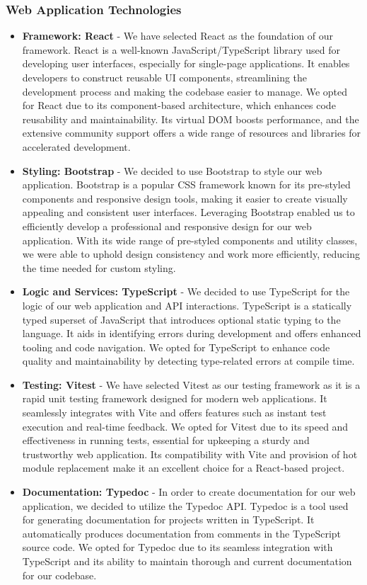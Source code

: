\documentclass[12pt]{article}
\begin{document}
\subsubsection{Web Application Technologies}
\begin{itemize}
	\item \textbf{Framework: React\cite{react}} - We have selected React as the foundation of our framework. React is a well-known JavaScript\cite{javascript}/TypeScript\cite{typescript} library used for developing user interfaces, especially for single-page applications. It enables developers to construct reusable UI components, streamlining the development process and making the codebase easier to manage.
	      We opted for React due to its component-based architecture, which enhances code reusability and maintainability. Its virtual DOM boosts performance, and the extensive community support offers a wide range of resources and libraries for accelerated development.
	\item \textbf{Styling: Bootstrap\cite{bootstrap}} - We decided to use Bootstrap to style our web application. Bootstrap is a popular CSS\cite{css} framework known for its pre-styled components and responsive design tools, making it easier to create visually appealing and consistent user interfaces. Leveraging Bootstrap enabled us to efficiently develop a professional and responsive design for our web application. With its wide range of pre-styled components and utility classes, we were able to uphold design consistency and work more efficiently, reducing the time needed for custom styling.
	\item \textbf{Logic and Services: TypeScript} - We decided to use TypeScript for the logic of our web application and API interactions. TypeScript is a statically typed superset of JavaScript that introduces optional static typing to the language. It aids in identifying errors during development and offers enhanced tooling and code navigation. We opted for TypeScript to enhance code quality and maintainability by detecting type-related errors at compile time.
	\item \textbf{Testing: Vitest\cite{vitest}} - We have selected Vitest as our testing framework as it is a rapid unit testing framework designed for modern web applications. It seamlessly integrates with Vite\cite{vite} and offers features such as instant test execution and real-time feedback. We opted for Vitest due to its speed and effectiveness in running tests, essential for upkeeping a sturdy and trustworthy web application. Its compatibility with Vite and provision of hot module replacement make it an excellent choice for a React-based project.
	\item \textbf{Documentation: Typedoc\cite{typedoc}} - In order to create documentation for our web application, we decided to utilize the Typedoc API. Typedoc is a tool used for generating documentation for projects written in TypeScript. It automatically produces documentation from comments in the TypeScript source code. We opted for Typedoc due to its seamless integration with TypeScript and its ability to maintain thorough and current documentation for our codebase.
\end{itemize}
\end{document}
